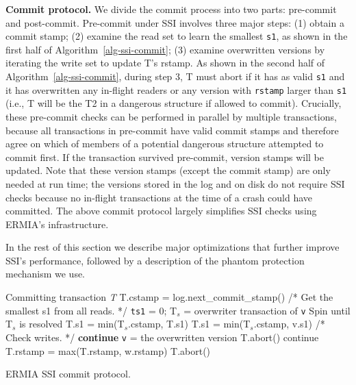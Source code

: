 {\bf Commit protocol.}
We divide the commit process into two parts: pre-commit and post-commit. Pre-commit under SSI involves three major steps: (1) obtain a commit stamp; (2) examine the read set to learn the smallest \texttt{s1}, as shown in the first half of Algorithm~\ref{alg-ssi-commit}; (3) examine overwritten versions by iterating the write set to update T's rstamp. As shown in the second half of Algorithm~\ref{alg-ssi-commit}, during step 3, T must abort if it has as valid \texttt{s1} and it has overwritten any in-flight readers or any version with \texttt{rstamp} larger than \texttt{s1} (i.e., T will be the T2 in a dangerous structure if allowed to commit). Crucially, these pre-commit checks can be performed in parallel by multiple transactions, because all transactions in pre-commit have valid commit stamps and therefore agree on which of members of a potential dangerous structure attempted to commit first. If the transaction survived pre-commit, version stamps will be updated. Note that these version stamps (except the commit stamp) are only needed at run time; the versions stored in the log and on disk do not require SSI checks because no in-flight transactions at the time of a crash could have committed. The above commit protocol largely simplifies SSI checks using ERMIA's infrastructure.

In the rest of this section we describe major optimizations that further improve SSI's performance, followed by a description of the phantom protection mechanism we use.

\begin{algorithm}
\begin{algorithmic}[1]
 Committing transaction \textit{T}
\STATE T.cstamp = log.next\_commit\_stamp()
\STATE /* Get the smallest s1 from all reads. */
\STATE \texttt{ts1} = 0;
\STATE T$_s$ = overwriter transaction of \texttt{v}
\STATE Spin until T$_s$ is resolved
\STATE T.s1 = min(T$_s$.cstamp, T.s1)
\ENDIF
\ELSE
\STATE T.s1 = min(T$_s$.cstamp, v.s1)
\ENDIF
\ENDFOR
\STATE
\STATE /* Check writes. */
\STATE \textbf{continue}
\ENDIF
\STATE \texttt{v} = the overwritten version
\STATE T.abort()
\ENDIF
{}
\STATE continue
\ENDIF
\STATE T.rstamp = max(T.rstamp, w.rstamp)
\STATE T.abort()
\ENDIF
\ENDFOR
\ENDFOR
\end{algorithmic}
\label{alg-ssi-commit}
\caption{ERMIA SSI commit protocol.}
\end{algorithm}

